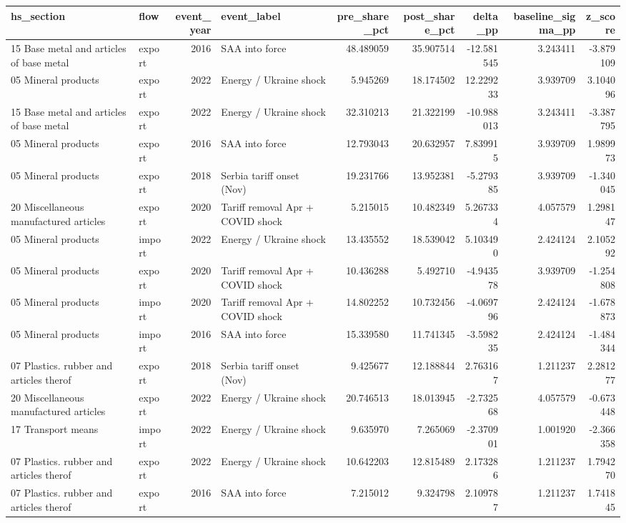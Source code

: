 \begin{tabular}{llrlrrrrr}
\toprule
hs_section & flow & event_year & event_label & pre_share_pct & post_share_pct & delta_pp & baseline_sigma_pp & z_score \\
\midrule
15 Base metal and articles of base metal & export & 2016 & SAA into force & 48.489059 & 35.907514 & -12.581545 & 3.243411 & -3.879109 \\
05 Mineral products & export & 2022 & Energy / Ukraine shock & 5.945269 & 18.174502 & 12.229233 & 3.939709 & 3.104096 \\
15 Base metal and articles of base metal & export & 2022 & Energy / Ukraine shock & 32.310213 & 21.322199 & -10.988013 & 3.243411 & -3.387795 \\
05 Mineral products & export & 2016 & SAA into force & 12.793043 & 20.632957 & 7.839915 & 3.939709 & 1.989973 \\
05 Mineral products & export & 2018 & Serbia tariff onset (Nov) & 19.231766 & 13.952381 & -5.279385 & 3.939709 & -1.340045 \\
20 Miscellaneous manufactured articles & export & 2020 & Tariff removal Apr + COVID shock & 5.215015 & 10.482349 & 5.267334 & 4.057579 & 1.298147 \\
05 Mineral products & import & 2022 & Energy / Ukraine shock & 13.435552 & 18.539042 & 5.103490 & 2.424124 & 2.105292 \\
05 Mineral products & export & 2020 & Tariff removal Apr + COVID shock & 10.436288 & 5.492710 & -4.943578 & 3.939709 & -1.254808 \\
05 Mineral products & import & 2020 & Tariff removal Apr + COVID shock & 14.802252 & 10.732456 & -4.069796 & 2.424124 & -1.678873 \\
05 Mineral products & import & 2016 & SAA into force & 15.339580 & 11.741345 & -3.598235 & 2.424124 & -1.484344 \\
07 Plastics. rubber and articles therof & export & 2018 & Serbia tariff onset (Nov) & 9.425677 & 12.188844 & 2.763167 & 1.211237 & 2.281277 \\
20 Miscellaneous manufactured articles & export & 2022 & Energy / Ukraine shock & 20.746513 & 18.013945 & -2.732568 & 4.057579 & -0.673448 \\
17 Transport means & import & 2022 & Energy / Ukraine shock & 9.635970 & 7.265069 & -2.370901 & 1.001920 & -2.366358 \\
07 Plastics. rubber and articles therof & export & 2022 & Energy / Ukraine shock & 10.642203 & 12.815489 & 2.173286 & 1.211237 & 1.794270 \\
07 Plastics. rubber and articles therof & export & 2016 & SAA into force & 7.215012 & 9.324798 & 2.109787 & 1.211237 & 1.741845 \\
\bottomrule
\end{tabular}
